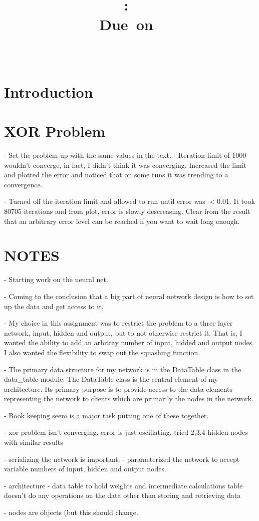 \documentclass{article}
\title{\vspace{2in}\textmd{\textbf{\hmwkClass:\ \hmwkTitle\ifthenelse{\equal{\hmwkSubTitle}{}}{}{\\\hmwkSubTitle}}}\\\normalsize\vspace{0.1in}\small{Due\ on\ \hmwkDueDate}\\\vspace{0.1in}\large{\textit{\hmwkClassInstructor\ \hmwkClassTime}}\vspace{3in}}
\date{}
\author{\textbf{\hmwkAuthorName}}
\begin{document}
\maketitle

\section*{Introduction}

\section*{XOR Problem}
- Set the problem up with the same values in the text.
- Iteration limit of 1000 wouldn't converge, in fact, I didn't think
it was converging.  Increased the limit and plotted the error and
noticed that on some runs it was trending to a convergence.

- Turned off the iteration limit and allowed to run until error was
$\lt 0.01$.  It took 80705 iterations and from plot, error is slowly
descreasing.  Clear from the result that an arbitrary error level can
be reached if you want to wait long enough.

\section*{NOTES}
- Starting work on the neural net.

- Coming to the conclusion that a big part of neural network
design is how to set up the data and get access to it.

- My choice in this assignment was to restrict the problem to a
three layer network, input, hidden and output, but to not
otherwise restrict it.  That is, I wanted the ability to add
an arbitray number of input, hidded and output nodes.  I also
wanted the flexibility to swap out the squashing function.

- The primary data structure for my network is in the DataTable
class in the data_table module.  The DataTable class is the central
element of my architecture.  Its primary purpose is to provide
access to the data elements representing the network to clients
which are primarily the nodes in the network.

- Book keeping seem is a major task putting one of these together.

- xor problem isn't converging.  error is just oscillating.  tried
2,3,4 hidden nodes with similar results

- serializing the network is important.
- parameterized the network to accept variable numbers of input,
hidden and output nodes.

- architecture
  - data table to hold weights and intermediate calculations
  table doesn't do any operations on the data other than storing and
  retrieving data

- nodes are objects (but this should change.
\end{document}

